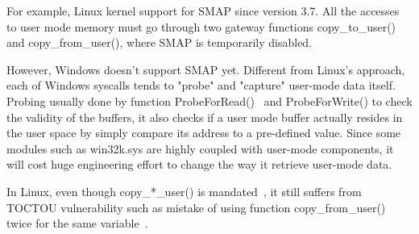 For example, Linux kernel support for SMAP since version 3.7. All the accesses to user mode memory must go through two gateway functions copy\_to\_user() and copy\_from\_user(), where SMAP is temporarily disabled.

However, Windows doesn't support SMAP yet. Different from Linux's approach, each of Windows syscalls tends to "probe" and "capture" user-mode data itself. Probing usually done by function ProbeForRead()~\cite{probeforread} and ProbeForWrite() to check the validity of the buffers, it also checks if a user mode buffer actually resides in the user space by simply compare its address to a pre-defined value. Since some modules such as win32k.sys are highly coupled with user-mode components, it will cost huge engineering effort to change the way it retrieve user-mode data.

In Linux, even though copy\_*\_user() is mandated~\cite{corbet2012linuxsmap}, it still suffers from TOCTOU vulnerability such as mistake of using function copy\_from\_user() twice for the same variable~\cite{double-fetch-linux}. 
